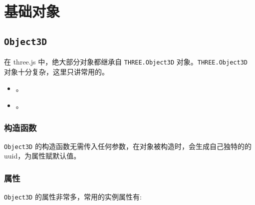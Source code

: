 \section{基础对象}

\subsection{\texttt{Object3D}}

在 three.js 中，绝大部分对象都继承自 \texttt{THREE.Object3D} 对象。\texttt{THREE.Object3D} 对象十分复杂，这里只讲常用的。
\begin{itemize}
  \item {}。
  \item {}。
\end{itemize}

\subsubsection*{构造函数}

\texttt{Object3D} 的构造函数无需传入任何参数，在对象被构造时，会生成自己独特的的 uuid，为属性赋默认值。

\subsubsection*{属性}

\texttt{Object3D} 的属性非常多，常用的实例属性有:

